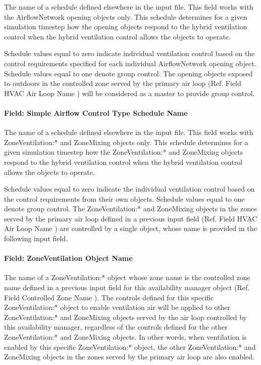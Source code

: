 The name of a schedule defined elsewhere in the input file. This field works with the AirflowNetwork opening objects only. This schedule determines for a given simulation timestep how the opening objects respond to the hybrid ventilation control when the hybrid ventilation control allows the objects to operate.

Schedule values equal to zero indicate individual ventilation control based on the control requirements specified for each individual AirflowNetwork opening object. Schedule values equal to one denote group control. The opening objects exposed to outdoors in the controlled zone served by the primary air loop (Ref. Field HVAC Air Loop Name ) will be considered as a master to provide group control.

\paragraph{Field: Simple Airflow Control Type Schedule Name}\label{field-simple-airflow-control-type-schedule-name}

The name of a schedule defined elsewhere in the input file. This field works with ZoneVentilation:* and ZoneMixing objects only. This schedule determines for a given simulation timestep how the ZoneVentilation:* and ZoneMixing objects respond to the hybrid ventilation control when the hybrid ventilation control allows the objects to operate.

Schedule values equal to zero indicate the individual ventilation control based on the control requirements from their own objects. Schedule values equal to one denote group control. The ZoneVentilation:* and ZoneMixing objects in the zones served by the primary air loop defined in a previous input field (Ref. Field HVAC Air Loop Name ) are controlled by a single object, whose name is provided in the following input field.

\paragraph{Field: ZoneVentilation Object Name}\label{field-zoneventilation-object-name}

The name of a ZoneVentilation:* object whose zone name is the controlled zone name defined in a previous input field for this availability manager object (Ref. Field Controlled Zone Name ). The controls defined for this specific ZoneVentilation:* object to enable ventilation air will be applied to other ZoneVentilation:* and ZoneMixing objects served by the air loop controlled by this availability manager, regardless of the controls defined for the other ZoneVentilation:* and ZoneMixing objects. In other words, when ventilation is enabled by this specific ZoneVentilation:* object, the other ZoneVentilation:* and ZoneMixing objects in the zones served by the primary air loop are also enabled.

